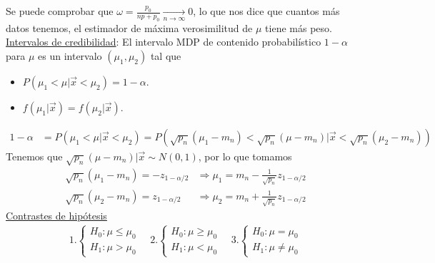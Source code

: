 Se puede comprobar que $\omega = \frac{p_0}{np + p_0} \xrightarrow[n \to \infty]{} 0$, lo que nos dice que cuantos más datos tenemos, el estimador de máxima verosimilitud de $\mu$ tiene más peso.
\\
\newline
\noindent \underline{Intervalos de credibilidad}: El intervalo MDP de contenido probabilístico $1-\alpha$ para $\mu$ es un intervalo $(\mu_1,\mu_2)$ tal que
\begin{itemize}
    \item $P(\mu_1 < \mu | \vec{x} < \mu_2) = 1-\alpha$.
    \item $f(\mu_1| \vec{x}) = f(\mu_2 | \vec{x})$.
\end{itemize}
\begin{align*}
    1 - \alpha &= P(\mu_1 < \mu | \vec{x} < \mu_2) = P(\sqrt{p_n}(\mu_1 - m_n) < \sqrt{p_n}(\mu - m_n) | \vec{x} < \sqrt{p_n}(\mu_2 - m_n)) 
\end{align*}
Tenemos que $\sqrt{p_n}(\mu - m_n) | \vec{x} \sim N(0,1)$, por lo que tomamos
\begin{align*}
    \sqrt{p_n}(\mu_1 - m_n) = - z_{1 - \alpha/2} &\Longrightarrow \mu_1 = m_n - \frac{1}{\sqrt{p_n}}z_{1 - \alpha/2} \\
    \sqrt{p_n}(\mu_2 - m_n) = z_{1 - \alpha/2} &\Longrightarrow \mu_2 = m_n + \frac{1}{\sqrt{p_n}}z_{1 - \alpha/2}
\end{align*}
\noindent \underline{Contrastes de hipótesis}
\begin{align*}
   1. \begin{cases}
        H_0 : \mu \leq \mu_0 \\
        H_1 : \mu > \mu_0
    \end{cases} \quad     2.\begin{cases}
        H_0 : \mu \ge \mu_0 \\
        H_1 : \mu < \mu_0
    \end{cases} \quad     3.\begin{cases}
        H_0 : \mu = \mu_0 \\
        H_1 : \mu \not = \mu_0
    \end{cases}
\end{align*}

